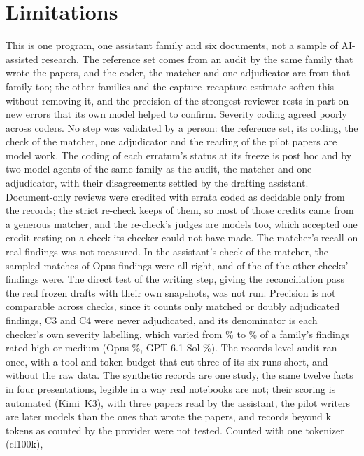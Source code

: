 \documentclass[11pt]{article}
\begin{document}
\section{Limitations}
\label{sec:limits}

This is one program, one assistant family and six documents, not a sample of AI-assisted research. The reference set comes from an
audit by the same family that wrote the papers, and the coder, the matcher and one adjudicator are from that family too; the other
families and the capture--recapture estimate soften this without removing it, and the precision of the strongest reviewer rests
in part on new errors that its own model helped to confirm. Severity coding agreed poorly across coders. No step
was validated by a person: the reference set, its coding, the check of the matcher, one adjudicator and the reading of the pilot papers
are model work. The coding of each erratum's status at its freeze is post hoc and by two model agents of the same family as the audit,
the matcher and one adjudicator, with their disagreements settled by the drafting assistant. Document-only reviews were credited with \RecConeRec{}
errata coded as decidable only from the records; the strict re-check keeps \StrictRecConeRec{} of them, so most of those credits came
from a generous matcher, and the re-check's judges are models too, which accepted one credit resting on a check its checker could not
have made. The matcher's recall on real findings was not measured. In the
assistant's check of the matcher, the \HandOpusN{} sampled matches of Opus findings were all right, and \HandOtherCorrect{} of the
\HandOtherN{} of the other checks' findings were. The direct test of the writing step, giving the reconciliation pass the
real frozen drafts with their own snapshots, was not run. Precision is not comparable across checks, since it counts only matched or doubly adjudicated findings, C3 and C4
were never adjudicated, and its denominator is each checker's own severity labelling, which varied from \HmShareMin\% to \HmShareMax\% of a family's
findings rated high or medium (Opus \HmShareOpus\%, GPT-6.1 Sol \HmShareGpt\%). The records-level audit ran once, with a tool and token budget that cut three of its six runs short, and
without the raw data. The synthetic records are one study, the same twelve facts in
four presentations, legible in a way real notebooks are not; their scoring is automated (Kimi~K3), with three papers read by the assistant, the
pilot writers are later models than the ones that wrote the papers, and records beyond \PilotTokLargeGpt{}k tokens as counted by the provider were not tested. Counted with one tokenizer (cl100k),
\end{document}
